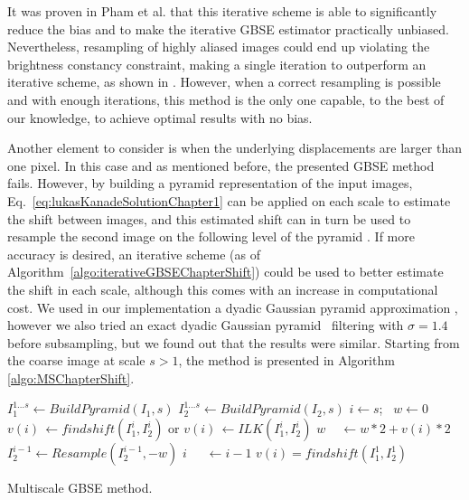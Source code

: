 It was proven in Pham et al. \cite{pham2005performance} that this iterative scheme is able to significantly reduce the bias and to make the iterative GBSE estimator practically unbiased. Nevertheless, resampling of highly aliased images could end up violating the brightness constancy constraint, making a single iteration to outperform an iterative scheme, as shown in \cite{pham2008}. However, when a correct resampling is possible and with enough iterations, this method is the only one capable, to the best of our knowledge, to achieve optimal results with no bias.


Another element to consider is when the underlying displacements are larger than one pixel. In this case and as mentioned before, the presented GBSE method fails. However, by building a pyramid representation of the input images, Eq.~\eqref{eq:lukasKanadeSolutionChapter1} can be applied on each scale to estimate the shift between images, and this estimated shift can in turn be used to resample the second image on the following level of the pyramid \cite{Thevenaz1998}. If more accuracy is desired, an iterative scheme (as of Algorithm~\ref{algo:iterativeGBSEChapterShift}) could be used to better estimate the shift in each scale, although this comes with an increase in computational cost.
We used in our implementation a dyadic Gaussian pyramid approximation \cite{burt1983laplacian}, however we also tried an exact dyadic Gaussian pyramid~\cite{Morel2011sift} filtering with $\sigma=1.4$ before subsampling, but we found out that the results were similar.
Starting from the coarse image at scale $s>1$, the method is presented in Algorithm \ref{algo:MSChapterShift}.

\begin{algorithm}[htpb]
\begin{algorithmic}[1]
\State $I_1^{1\dots s} \leftarrow {BuildPyramid}(I_1, s)$ \hspace{-2.5mm} 
\State $I_2^{1\dots s} \leftarrow {BuildPyramid}(I_2, s)$ 
\State $i\leftarrow s$; \, $w \leftarrow 0$\;
	\State $v(i)\, \leftarrow {findshift}(I_1^i,I_2^i)$  
    \State or $v(i)\, \leftarrow ILK(I_1^i, I_2^i)$\; 
	\State $w \, \,\, \,\, \,\, \leftarrow w * 2+ v(i) * 2$\;
	\State $I_2^{i-1} \leftarrow {Resample}(I_2^{i-1}, -w)$\;
	\State $i\, \,\, \,\, \,\,\,\, \leftarrow i-1$\;
\EndWhile
\State $v(i) = {findshift}(I_1^1,I_2^1)$\;
\EndProcedure
\end{algorithmic}
\caption{Multiscale GBSE method.}\label{algo:MSChapterShift}
\end{algorithm}

